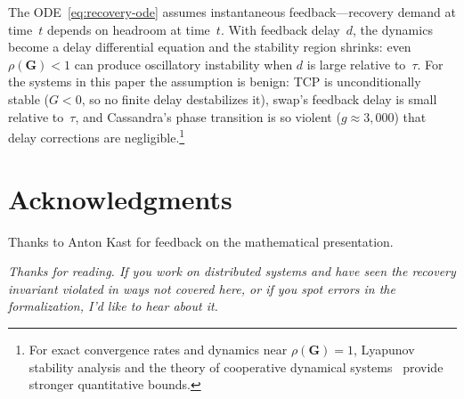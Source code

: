 \documentclass[11pt]{article}
\begin{document}
The ODE~\eqref{eq:recovery-ode} assumes instantaneous feedback---recovery
demand at time~$t$ depends on headroom at time~$t$. With feedback
delay~$d$, the dynamics become a delay differential equation and the
stability region shrinks: even $\rho(\mathbf{G}) < 1$ can produce
oscillatory instability when $d$ is large relative to~$\tau$. For the
systems in this paper the assumption is benign: TCP is unconditionally
stable ($G < 0$, so no finite delay destabilizes it), swap's feedback
delay is small relative to~$\tau$, and Cassandra's phase transition is so
violent ($g \approx 3{,}000$) that delay corrections are
negligible.\footnote{For exact convergence rates and dynamics near
$\rho(\mathbf{G}) = 1$, Lyapunov stability analysis and the theory of
cooperative dynamical
systems~\cite{hirsch1985systems,smith1995monotone} provide stronger quantitative
bounds.}

\section*{Acknowledgments}

Thanks to Anton Kast for feedback on the mathematical presentation.




\bigskip
\noindent\textit{Thanks for reading. If you work on distributed systems and have
seen the recovery invariant violated in ways not covered here, or if you spot
errors in the formalization, I'd like to hear about it.}
\end{document}
